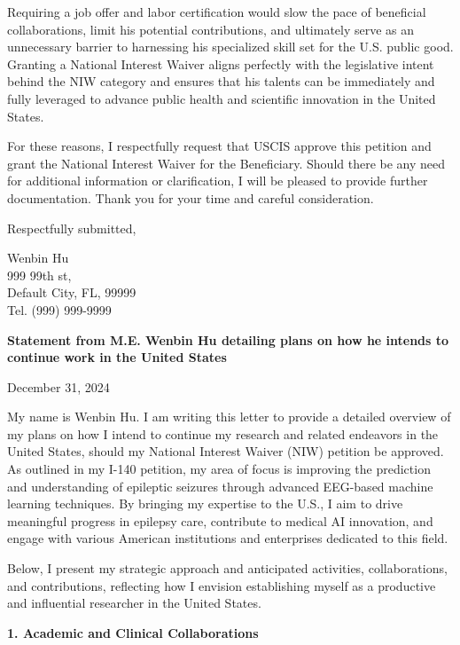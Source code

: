\documentclass{article}
\begin{document}
Requiring a job offer and labor certification would slow the pace of beneficial collaborations, limit his potential contributions, and ultimately serve as an unnecessary barrier to harnessing his specialized skill set for the U.S. public good. Granting a National Interest Waiver aligns perfectly with the legislative intent behind the NIW category and ensures that his talents can be immediately and fully leveraged to advance public health and scientific innovation in the United States.

For these reasons, I respectfully request that USCIS approve this petition and grant the National Interest Waiver for the Beneficiary. Should there be any need for additional information or clarification, I will be pleased to provide further documentation.
Thank you for your time and careful consideration.

Respectfully submitted,

\vspace{5\baselineskip}

Wenbin Hu\\
999 99th st,\\
Default City, FL, 99999\\
Tel. (999) 999-9999




\clearpage

{\bf Statement from M.E. Wenbin Hu detailing plans on how he intends to continue work in the United States}

\label{plans}
December 31, 2024

My name is Wenbin Hu. I am writing this letter to provide a detailed overview of my plans on how I intend to continue my research and related endeavors in the United States, should my National Interest Waiver (NIW) petition be approved. As outlined in my I-140 petition, my area of focus is improving the prediction and understanding of epileptic seizures through advanced EEG-based machine learning techniques. By bringing my expertise to the U.S., I aim to drive meaningful progress in epilepsy care, contribute to medical AI innovation, and engage with various American institutions and enterprises dedicated to this field.

Below, I present my strategic approach and anticipated activities, collaborations, and contributions, reflecting how I envision establishing myself as a productive and influential researcher in the United States.


{\bf 1. Academic and Clinical Collaborations }
\end{document}
